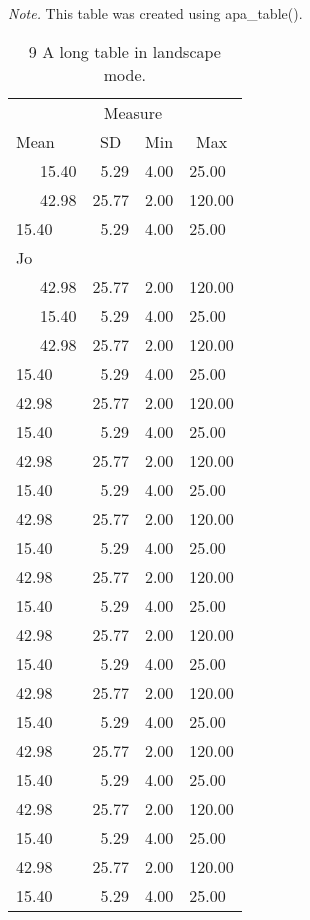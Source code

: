 \documentclass[man]{apa6}
\makeatletter
\newenvironment{lltable}{\begin{landscape}\begin{center}\begin{ThreePartTable}}{\end{ThreePartTable}\end{center}\end{landscape}}
\newcommand\LastLTentrywidth{1em}
\newlength\longtablewidth
\newcommand{\getlongtablewidth}{\begingroup \ifcsname LT@\roman{LT@tables}\endcsname \global\longtablewidth=0pt \renewcommand{\LT@entry}[2]{\global\advance\longtablewidth by ##2\relax\gdef\LastLTentrywidth{##2}}\@nameuse{LT@\roman{LT@tables}} \fi \endgroup}
\makeatother
\begin{document}
\begin{lltable}


\begin{TableNotes}[para]
\normalsize{\textit{Note.} This table was created using apa\_table().}
\end{TableNotes}
\begin{longtable}{lrrl}\noalign{\getlongtablewidth\global\LTcapwidth=\longtablewidth}
\caption{\label{tab:unnamed-chunk-9}9 A long table in landscape mode.}\\
\toprule
 & \multicolumn{2}{c}{Measure}  &\\
\cmidrule(r){2-3}
Mean & \multicolumn{1}{c}{SD} & \multicolumn{1}{c}{Min} & \multicolumn{1}{c}{Max}\\
\midrule
\ \ \ 15.40 & 5.29 & 4.00 & 25.00\\
\ \ \ 42.98 & 25.77 & 2.00 & 120.00\\
15.40 & 5.29 & 4.00 & 25.00\\
Jo &  &  & \\ \midrule
\ \ \ 42.98 & 25.77 & 2.00 & 120.00\\
\ \ \ 15.40 & 5.29 & 4.00 & 25.00\\
\ \ \ 42.98 & 25.77 & 2.00 & 120.00\\
15.40 & 5.29 & 4.00 & 25.00\\
42.98 & 25.77 & 2.00 & 120.00\\
15.40 & 5.29 & 4.00 & 25.00\\
42.98 & 25.77 & 2.00 & 120.00\\
15.40 & 5.29 & 4.00 & 25.00\\
42.98 & 25.77 & 2.00 & 120.00\\
15.40 & 5.29 & 4.00 & 25.00\\
42.98 & 25.77 & 2.00 & 120.00\\
15.40 & 5.29 & 4.00 & 25.00\\
42.98 & 25.77 & 2.00 & 120.00\\
15.40 & 5.29 & 4.00 & 25.00\\
42.98 & 25.77 & 2.00 & 120.00\\
15.40 & 5.29 & 4.00 & 25.00\\
42.98 & 25.77 & 2.00 & 120.00\\
15.40 & 5.29 & 4.00 & 25.00\\
42.98 & 25.77 & 2.00 & 120.00\\
15.40 & 5.29 & 4.00 & 25.00\\
42.98 & 25.77 & 2.00 & 120.00\\
15.40 & 5.29 & 4.00 & 25.00\\

\end{longtable}
\end{lltable}
\end{document}

